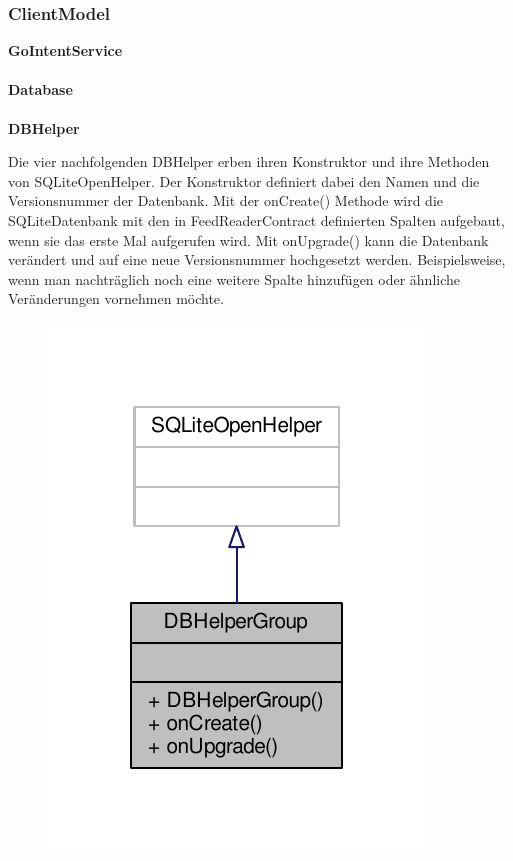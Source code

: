 \subsubsection{ClientModel}

\textbf{GoIntentService}

\paragraph{Database}

\textbf{DBHelper}

Die vier nachfolgenden DBHelper erben ihren Konstruktor und ihre Methoden von SQLiteOpenHelper. Der Konstruktor definiert dabei den Namen und die Versionsnummer der Datenbank.
Mit der onCreate() Methode wird die SQLiteDatenbank mit den in FeedReaderContract definierten Spalten aufgebaut, wenn sie das erste Mal aufgerufen wird.
Mit onUpgrade() kann die Datenbank verändert und auf eine neue Versionsnummer hochgesetzt werden. Beispielsweise, wenn man nachträglich noch eine weitere Spalte hinzufügen oder ähnliche Veränderungen vornehmen möchte.

\begin{figure}[H]
	\includegraphics[scale = 1]{res/umlClasses/d_b_helper_group__coll__graph.pdf}
	\centering	
\end{figure}

